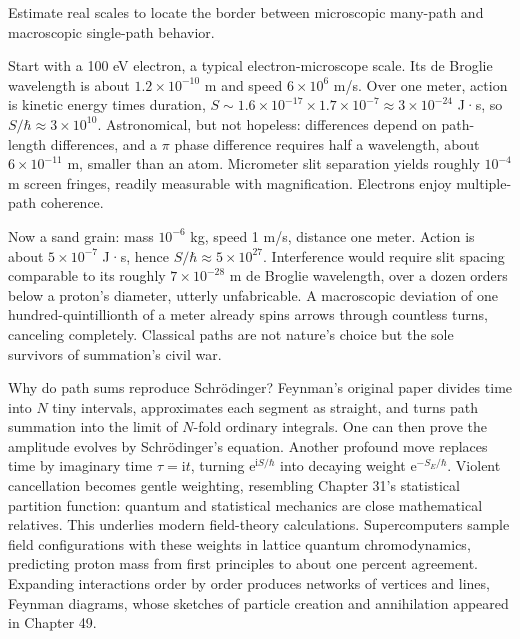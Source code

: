 Estimate real scales to locate the border between microscopic many-path and macroscopic single-path behavior.

Start with a 100 eV electron, a typical electron-microscope scale. Its de Broglie wavelength is about \(1.2\times10^{-10}\) m and speed \(6\times10^{6}\) m/s. Over one meter, action is kinetic energy times duration, \(S\sim 1.6\times10^{-17}\times1.7\times10^{-7}\approx3\times10^{-24}\) J·s, so \(S/\hbar\approx3\times10^{10}\). Astronomical, but not hopeless: differences depend on path-length differences, and a \(\pi\) phase difference requires half a wavelength, about \(6\times10^{-11}\) m, smaller than an atom. Micrometer slit separation yields roughly \(10^{-4}\) m screen fringes, readily measurable with magnification. Electrons enjoy multiple-path coherence.

Now a sand grain: mass \(10^{-6}\) kg, speed 1 m/s, distance one meter. Action is about \(5\times10^{-7}\) J·s, hence \(S/\hbar\approx5\times10^{27}\). Interference would require slit spacing comparable to its roughly \(7\times10^{-28}\) m de Broglie wavelength, over a dozen orders below a proton's diameter, utterly unfabricable. A macroscopic deviation of one hundred-quintillionth of a meter already spins arrows through countless turns, canceling completely. Classical paths are not nature's choice but the sole survivors of summation's civil war.

\begin{challenge}
Why do path sums reproduce Schrödinger? Feynman's original paper divides time into \(N\) tiny intervals, approximates each segment as straight, and turns path summation into the limit of \(N\)-fold ordinary integrals. One can then prove the amplitude evolves by Schrödinger's equation. Another profound move replaces time by imaginary time \(\tau=\mathrm{i}t\), turning \(\mathrm{e}^{\mathrm{i}S/\hbar}\) into decaying weight \(\mathrm{e}^{-S_E/\hbar}\). Violent cancellation becomes gentle weighting, resembling Chapter 31's statistical partition function: quantum and statistical mechanics are close mathematical relatives. This underlies modern field-theory calculations. Supercomputers sample field configurations with these weights in lattice quantum chromodynamics, predicting proton mass from first principles to about one percent agreement. Expanding interactions order by order produces networks of vertices and lines, Feynman diagrams, whose sketches of particle creation and annihilation appeared in Chapter 49.
\end{challenge}

